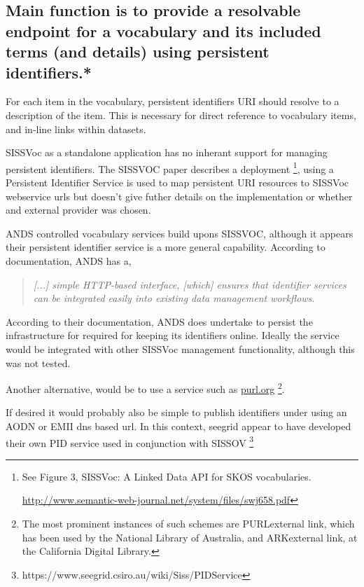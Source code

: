 \documentclass[10pt,a4paper]{article}
\newenvironment{italicquotes}
{\begin{quote}\itshape}
{\end{quote}}
\begin{document}
\begin{flushleft}
  \subsection{
   Main function is to provide a resolvable endpoint for a vocabulary and its
  included terms (and details) using persistent identifiers.* 
  }

  For each item in the vocabulary, persistent identifiers {URI} should
  resolve to a description of the item.  This is necessary for direct reference to
  vocabulary items, and in-line links within datasets.

  \item[SISSVoc] as a standalone application has no inherant support for managing persistent
  identifiers. The SISSVOC paper describes a deployment \footnote{ See Figure 3,
  SISSVoc: A Linked Data API for SKOS vocabularies.

  \url{http://www.semantic-web-journal.net/system/files/swj658.pdf} }, using a
  Persistent Identifier Service is used to map persistent URI resources to SISSVoc
  webservice urls but doesn't give futher details on the implementation or
  whether and external provider was chosen. 

  \item[ANDS] controlled vocabulary services build upons SISSVOC, although it appears
  their persistent identifier service is a more general capability. According to
  documentation, ANDS has a, 

  \begin{italicquotes} [...] simple HTTP-based interface, [which] ensures that
  identifier services can be integrated easily into existing data management
  workflows.  \end{italicquotes}
  According to their documentation, ANDS does undertake to persist the infrastructure for required for
  keeping its identifiers online. Ideally the service would be integrated
  with other SISSVoc management functionality, although this was not tested.

  \item[]Another alternative, would be to use a service such as \url{purl.org}  \footnote{ The most
  prominent instances of such schemes are PURLexternal link, which has been used
  by the National Library of Australia, and ARKexternal link, at the California
  Digital Library.  }. 

  \item[]If desired it would probably also be simple to publish identifiers under using an
  AODN or EMII dns based url. In this context, seegrid appear to have developed their own
  PID service used in conjunction with SISSOV  \footnote{
  https://www.seegrid.csiro.au/wiki/Siss/PIDService}  
  

\end{flushleft}
\end{document}
